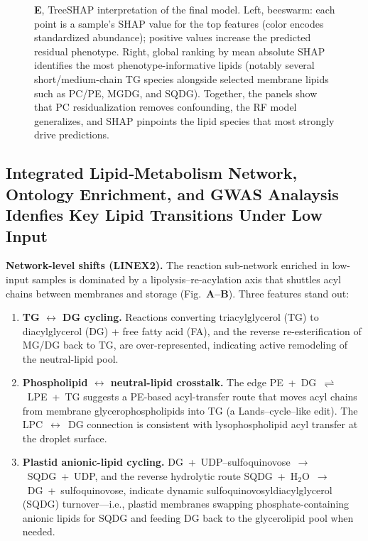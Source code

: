 \documentclass[10pt,letterpaper]{article}
\begin{document}
\begin{figure}[!ht]
{  \textbf{E}, TreeSHAP interpretation of the final model. Left, beeswarm: each point is a sample’s SHAP value for the top features (color encodes standardized abundance); positive values increase the predicted residual phenotype. Right, global ranking by mean absolute SHAP identifies the most phenotype-informative lipids (notably several short/medium-chain TG species alongside selected membrane lipids such as PC/PE, MGDG, and SQDG). 
  Together, the panels show that PC residualization removes confounding, the RF model generalizes, and SHAP pinpoints the lipid species that most strongly drive predictions.}
  \label{fig:fig4_rf_shap}
\end{figure}



\subsection*{Integrated Lipid‐Metabolism Network, Ontology Enrichment, and GWAS Analaysis Idenfies Key Lipid Transitions Under Low Input}


\noindent \textbf{Network-level shifts (LINEX2).}
The reaction sub-network enriched in low-input samples is dominated by a lipolysis–re-acylation axis that shuttles acyl chains between membranes and storage (Fig.\ \textbf{A–B}). Three features stand out:
\begin{enumerate}\itemsep3pt
  \item \textbf{TG $\leftrightarrow$ DG cycling.} Reactions converting triacylglycerol (TG) to diacylglycerol (DG) {+} free fatty acid (FA), and the reverse re-esterification of MG/DG back to TG, are over-represented, indicating active remodeling of the neutral-lipid pool.
  \item \textbf{Phospholipid $\leftrightarrow$ neutral-lipid crosstalk.} The edge \mbox{PE + DG $\rightleftharpoons$ LPE + TG} suggests a PE-based acyl-transfer route that moves acyl chains from membrane glycerophospholipids into TG (a Lands–cycle–like edit). The \mbox{LPC $\leftrightarrow$ DG} connection is consistent with lysophospholipid acyl transfer at the droplet surface.
  \item \textbf{Plastid anionic-lipid cycling.} \mbox{DG + UDP–sulfoquinovose $\rightarrow$ SQDG + UDP}, and the reverse hydrolytic route \mbox{SQDG + H$_2$O $\rightarrow$ DG + sulfoquinovose}, indicate dynamic sulfoquinovosyldiacylglycerol (SQDG) turnover—i.e., plastid membranes swapping phosphate-containing anionic lipids for SQDG and feeding DG back to the glycerolipid pool when needed.
\end{enumerate}
\end{document}
